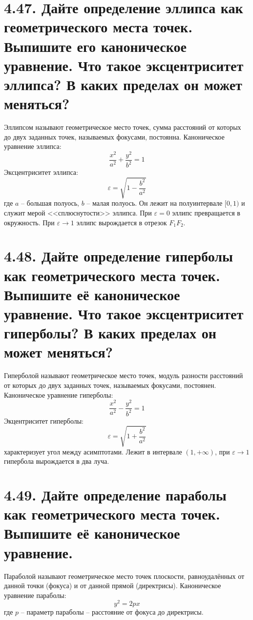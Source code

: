 \documentclass{article}
\begin{document}
\section*{\LARGE 4.47. Дайте определение эллипса как геометрического места точек. Выпишите его каноническое уравнение. Что такое эксцентриситет эллипса? В каких пределах он может меняться? }
Эллипсом называют геометрическое место точек, сумма расстояний от которых до двух заданных точек, называемых фокусами, постоянна.
\newline Каноническое уравнение эллипса:
$$
\frac{x^2}{a^2} + \frac{y^2}{b^2} = 1
$$
Эксцентриситет эллипса:
$$
\varepsilon = \sqrt{1 - \frac{b^2}{a^2}}
$$
где $a$ -- большая полуось, $b$ -- малая полуось. Он лежит на полуинтервале $[0, 1)$ и служит мерой <<сплюснутости>> эллипса. При $\varepsilon = 0$ эллипс превращается в окружность. При $\varepsilon \rightarrow 1$ эллипс вырождается в отрезок $F_1F_2$.

\section*{\LARGE 4.48. Дайте определение гиперболы как геометрического места точек. Выпишите её каноническое уравнение. Что такое эксцентриситет гиперболы? В каких пределах он может меняться? }
Гиперболой называют геометрическое место точек, модуль разности расстояний от которых до двух заданных точек, называемых фокусами, постоянен.
\newline Каноническое уравнение гиперболы:
$$
\frac{x^2}{a^2} - \frac{y^2}{b^2} = 1
$$
Экцентриситет гиперболы:
$$
\varepsilon = \sqrt{1 + \frac{b^2}{a^2}}
$$
характеризует угол между асимптотами. Лежит в интервале $(1, +\infty)$, при $\varepsilon \rightarrow 1$ гипербола вырождается в два луча.

\section*{\LARGE 4.49. Дайте определение параболы как геометрического места точек. Выпишите её каноническое уравнение.}
Параболой называют геометрическое место точек плоскости, равноудалённых от данной точки (фокуса) и от данной прямой (директрисы).
\newline Каноническое уравнение параболы:
$$
y^2 = 2px
$$
где $p$ -- параметр параболы -- расстояние от фокуса до директрисы.
\end{document}
